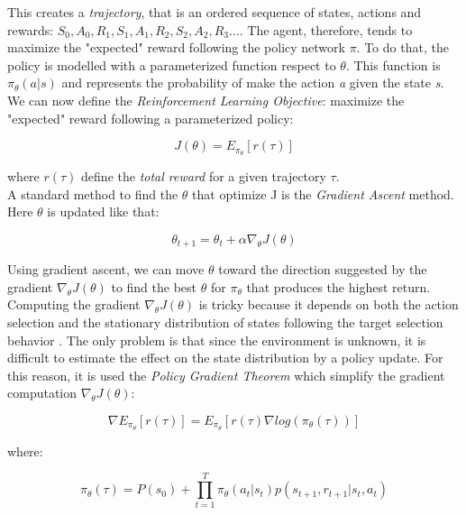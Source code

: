 This creates a \textsl{trajectory}, that is an ordered sequence of states, actions and rewards: $S_{0}, A_{0}, R_{1}, S_{1}, A_{1}, R_{2}, S_{2}, A_{2}, R_{3} \dots$.
The agent, therefore, tends to maximize the "expected" reward following the policy network $\pi$. To do that, the policy is modelled with a parameterized function respect to $\theta$. This function is  $\pi_{\theta}(a|s)$ and represents the probability of make the action \textit{a} given the state \textit{s}. \\ 
We can now define the \textsl{Reinforcement Learning Objective}: maximize the "expected" reward following a parameterized policy:

\begin{equation}
    J(\theta) = E_{\pi_{\theta}} [r(\tau)]
\end{equation}

where $r(\tau)$ define the \textsl{total reward} for a given trajectory $\tau$. \\
A standard method to find the $\theta$ that optimize J is the \textsl{Gradient Ascent} method. Here $\theta$ is updated like that:

\begin{equation}
    \theta_{t+1} = \theta_{t} + \alpha\nabla_{\theta} J(\theta)
\end{equation}

Using gradient ascent, we can move $\theta$ toward the direction suggested by the gradient $\nabla_{\theta}J(\theta)$ to find the best $\theta$ for $\pi_{\theta}$ that produces the highest return. Computing the gradient $\nabla_{\theta}J(\theta)$ is tricky because it depends on both the action selection and the stationary distribution of states following the target selection behavior \cite{gradient}. The only problem is that since the environment is unknown, it is difficult to estimate the effect on the state distribution by a policy update.
For this reason, it is used the \textsl{Policy Gradient Theorem} which simplify the gradient computation  $\nabla_{\theta}J(\theta)$:

\begin{equation}\label{eq:nablae}
    \nabla E_{\pi_{\theta}}[r(\tau)] = E_{\pi_{\theta}}[r(\tau)\nabla log(\pi_{\theta}(\tau))]
\end{equation}

where:

\begin{equation}\label{eq:pitau}
    \pi_{\theta}(\tau) = P(s_{0}) + \prod_{t=1}^{T} \pi_{\theta}(a_{t}|s_{t})p(s_{t+1}, r_{t+1} | s_{t}, a_{t})
\end{equation}

